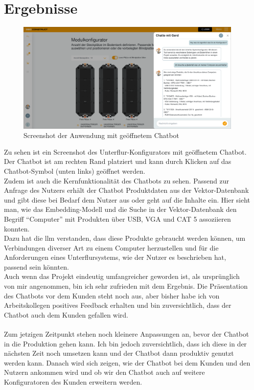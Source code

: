 \chapter{Ergebnisse}\label{ch:ergebnisse}
\begin{figure}[H]
    \begin{center}
        \includegraphics[width=14cm]{bilder/chatbot.png}
        \caption{Screenshot der Anwendung mit geöffnetem Chatbot}\label{fig:bodentank}
    \end{center}
\end{figure}
Zu sehen ist ein Screenshot des Unterflur-Konfigurators mit geöffnetem Chatbot.  
Der Chatbot ist am rechten Rand platziert und kann durch Klicken auf das Chatbot-Symbol (unten links) geöffnet werden.\\  
Zudem ist auch die Kernfunktionalität des Chatbots zu sehen. Passend zur Anfrage des Nutzers erhält der Chatbot Produktdaten aus der  
Vektor-Datenbank und gibt diese bei Bedarf dem Nutzer aus oder geht auf die Inhalte ein.  
Hier sieht man, wie das Embedding-Modell und die Suche in der Vektor-Datenbank den Begriff \enquote{Computer} mit Produkten über USB, VGA und CAT 5  
assoziieren konnten.\\  
Dazu hat die \gls{llm} verstanden, dass diese Produkte gebraucht werden können, um Verbindungen diverser Art zu einem Computer herzustellen  
und für die Anforderungen eines Unterflursystems, wie der Nutzer es beschrieben hat, passend sein könnten.\\  
Auch wenn das Projekt eindeutig umfangreicher geworden ist, als ursprünglich von mir angenommen, bin ich sehr zufrieden mit dem Ergebnis.  
Die Präsentation des Chatbots vor dem Kunden steht noch aus, aber bisher habe ich von Arbeitskollegen positives Feedback erhalten  
und bin zuversichtlich, dass der Chatbot auch dem Kunden gefallen wird.\\\\  
Zum jetzigen Zeitpunkt stehen noch kleinere Anpassungen an, bevor der Chatbot in die Produktion gehen kann. Ich bin jedoch zuversichtlich,  
dass ich diese in der nächsten Zeit noch umsetzen kann und der Chatbot dann produktiv genutzt werden kann.  
Danach wird sich zeigen, wie der Chatbot bei dem Kunden und den Nutzern ankommen wird und ob wir den Chatbot auch auf weitere Konfiguratoren  
des Kunden erweitern werden.